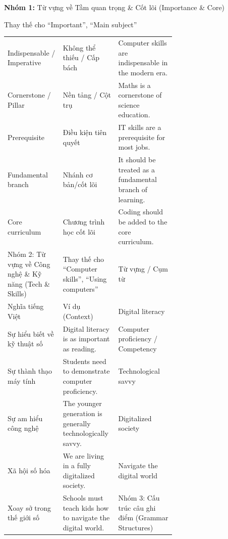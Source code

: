 \textbf{Nhóm 1:} Từ vựng về Tầm quan trọng \& Cốt lõi (Importance \&
Core)

Thay thế cho ``Important'', ``Main subject''

\begingroup
\sloppy
\renewcommand{\tabularxcolumn}[1]{>{\RaggedRight\arraybackslash}m{#1}}
\setlength{\tabcolsep}{6pt}
\renewcommand{\arraystretch}{1.15}
\begin{cdtablebox}
\begin{tabularx}{\linewidth}{|M{0.33\linewidth}|M{0.33\linewidth}|Y|}
\hline
{}  &  &  \\ \hline
Indispensable /\allowbreak{} Imperative & Không thể thiếu /\allowbreak{} Cấp bách & Computer skills are indispensable in the modern era.\allowbreak{} \\ \hline
Cornerstone /\allowbreak{} Pillar & Nền tảng /\allowbreak{} Cột trụ & Maths is a cornerstone of science education.\allowbreak{} \\ \hline
Prerequisite & Điều kiện tiên quyết & IT skills are a prerequisite for most jobs.\allowbreak{} \\ \hline
Fundamental branch & Nhánh cơ bản/\allowbreak{}cốt lõi & It should be treated as a fundamental branch of learning.\allowbreak{} \\ \hline
Core curriculum & Chương trình học cốt lõi & Coding should be added to the core curriculum.\allowbreak{} \\ \hline
Nhóm 2: Từ vựng về Công nghệ \& Kỹ năng (Tech \& Skills) & Thay thế cho “Computer skills”, “Using computers” & Từ vựng /\allowbreak{} Cụm từ \\ \hline
Nghĩa tiếng Việt & Ví dụ (Context) & Digital literacy \\ \hline
Sự hiểu biết về kỹ thuật số & Digital literacy is as important as reading.\allowbreak{} & Computer proficiency /\allowbreak{} Competency \\ \hline
Sự thành thạo máy tính & Students need to demonstrate computer proficiency.\allowbreak{} & Technological savvy \\ \hline
Sự am hiểu công nghệ & The younger generation is generally technologically savvy.\allowbreak{} & Digitalized society \\ \hline
Xã hội số hóa & We are living in a fully digitalized society.\allowbreak{} & Navigate the digital world \\ \hline
Xoay sở trong thế giới số & Schools must teach kids how to navigate the digital world.\allowbreak{} & Nhóm 3: Cấu trúc câu ghi điểm (Grammar Structures) \\ \hline
\end{tabularx}
\end{cdtablebox}
\endgroup

